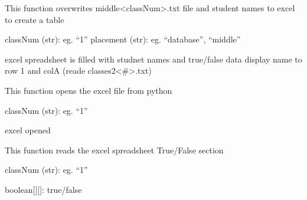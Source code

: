 \documentclass[letterpaper,10pt,english]{sphinxmanual}
\begin{document}
\begin{fulllineitems}
\label{\detokenize{ExcelFunctions:ExcelFunctions.MiddletoExcel}}
\pysigstartsignatures
{}
\pysigstopsignatures
\sphinxAtStartPar
This function overwrites middle\textless{}classNum\textgreater{}.txt file and student names to excel to create a table
\begin{description}
\sphinxAtStartPar
classNum (str): eg. “1”
placement (str): eg. “database”, “middle”

\sphinxAtStartPar
excel spreadsheet is filled with studnet names and true/false data
display name to row 1 and colA (reade classes2\sphinxhyphen{}\textless{}\#\textgreater{}.txt)

\end{description}

\end{fulllineitems}


\begin{fulllineitems}
\label{\detokenize{ExcelFunctions:ExcelFunctions.openExcelFile}}
\pysigstartsignatures
{}
\pysigstopsignatures
\sphinxAtStartPar
This function opens the excel file from python
\begin{description}
\sphinxAtStartPar
classNum (str): eg. “1”

\sphinxAtStartPar
excel opened

\end{description}

\end{fulllineitems}


\begin{fulllineitems}
\label{\detokenize{ExcelFunctions:ExcelFunctions.readExcel}}
\pysigstartsignatures
{}
\pysigstopsignatures
\sphinxAtStartPar
This function reads the excel spreadsheet True/False section
\begin{description}
\sphinxAtStartPar
classNum (str): eg. “1”

\sphinxAtStartPar
boolean{[}{]}{[}{]}: true/false

\end{description}

\end{fulllineitems}
\end{document}
